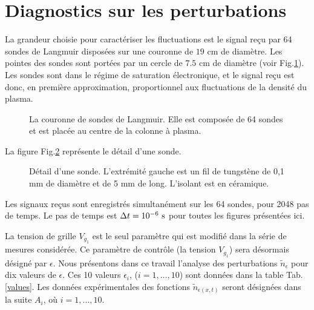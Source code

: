 \documentclass{book}
\begin{document}
\section{Diagnostics sur les perturbations}\label{sectiondiagpert}
La grandeur choisie pour caract\'eriser les fluctuations est le signal
re\c cu par 64 sondes de Langmuir dispos\'ees sur une couronne de $19$
cm de diam\`etre. Les pointes des sondes sont port\'ees par un cercle
de 
$7.5$ cm de diam\`etre (voir Fig.\ref{couronne}). Les sondes sont dans
le r\'egime de saturation 
\'electronique, et le signal re\c cu est donc, en premi\`ere
approximation, proportionnel aux
fluctuations de la densit\'e  du plasma.



\begin{figure}
\centerline{}
\caption{La couronne de sondes de Langmuir. Elle est compos\'ee de 64
sondes et est plac\'ee au centre de la colonne \`a plasma.}
\label{couronne}
\end{figure}


La figure Fig.\ref{unesonde} repr\'esente le d\'etail d'une sonde.

\begin{figure}[htb]
 \centerline{}
 \caption{D\'etail d'une sonde. L'extr\'emit\'e gauche est un fil de
tungst\`ene de 0,1 mm de diam\`etre et de 5 mm de long. L'isolant est
en c\'eramique.}
 \label{unesonde}
\end{figure}
%



Les signaux re\c cus  sont enregistr\'es
simultan\'ement sur les 64 sondes, pour 2048 pas de temps.
Le pas de temps est $\Delta t=10^{-6}\ \rm{s}$ pour toutes les figures
pr\'esent\'ees ici.

La tension de grille
$V_{g_1}$ est le seul param\`etre qui est modifi\'e dans la s\'erie de
mesures consid\'er\'ee. Ce param\`etre de contr\^ole (la tension
$V_{g_1}$) sera d\'esormais
d\'esign\'e par $\epsilon$. Nous pr\'esentons dans ce travail
l'analyse des perturbations $\tilde{n}_\epsilon$ pour dix valeurs de
$\epsilon$. Ces 10 valeurs $\epsilon_i$, ($i=1,\dots,10$) sont
donn\'ees dans la table 
Tab.\ref{values}. Les donn\'ees exp\'erimentales des fonctions
$\tilde n_{\epsilon(x,t)}$ seront d\'esign\'ees dans la suite $A_i$, o\`u
$i=1,\dots,10$.
\end{document}
